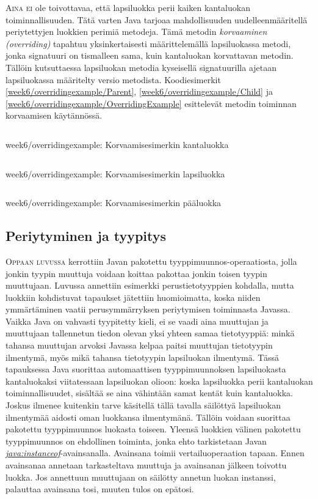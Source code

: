 \documentclass[openany]{book}
\newcommand{\newthought}[1]{\smallskip\textsc{#1}}
\newcommand{\eng}[1]{\textit{(#1)}}
\newcommand{\new}[1]{\textit{\gls{#1}}}
\newcommand{\neweng}[2]{\new{#1} \eng{#2}}
\newcommand{\java}[1]{\underline{\gls{java:#1}}}
\newcommand{\newjava}[1]{\textit{\java{#1}}}
\newcommand{\code}[3]{
	\begin{listing}
		\linespread{0.85}
		\inputminted{java}{OhjelmointiopasEsimerkit/src/#1/#2.java}
		\caption{#1: #3}
		\label{#1/#2}
	\end{listing}
}
\begin{document}
\newthought{Aina ei} ole toivottavaa, että lapsiluokka perii kaiken kantaluokan toiminnallisuuden.
Tätä varten Java tarjoaa mahdollisuuden uudelleenmääritellä periytettyjen luokkien perimiä
metodeja. Tämä metodin \neweng{korvaaminen}{overriding} tapahtuu yksinkertaisesti määrittelemällä
lapsiluokassa metodi, jonka \gls{signatuuri} on tismalleen sama, kuin kantaluokan korvattavan
metodin. Tällöin kutsuttaessa lapsiluokan metodia kyseisellä signatuurilla ajetaan lapsiluokassa
määritelty versio metodista. Koodiesimerkit \ref{week6/overridingexample/Parent},
\ref{week6/overridingexample/Child} ja \ref{week6/overridingexample/OverridingExample} esittelevät
metodin toiminnan korvaamisen käytännössä.

\code{week6/overridingexample}{Parent}{Korvaamisesimerkin kantaluokka}
\code{week6/overridingexample}{Child}{Korvaamisesimerkin lapsiluokka}
\code{week6/overridingexample}{OverridingExample}{Korvaamisesimerkin pääluokka}

\subsection{Periytyminen ja tyypitys}
\label{casting2}

\newthought{Oppaan luvussa}  kerrottiin Javan
\gls{pakotettu tyyppimuunnos}-operaatiosta, jolla jonkin tyypin muuttuja voidaan koittaa pakottaa
jonkin toisen tyypin muuttujaan. Luvussa annettiin esimerkki perustietotyyppien kohdalla, mutta
luokkiin kohdistuvat tapaukset jätettiin huomioimatta, koska niiden ymmärtäminen vaatii
perusymmärryksen periytymisen toiminnasta Javassa. Vaikka Java on vahvasti tyypitetty kieli, ei se
vaadi aina muuttujan ja muuttujaan tallennetun tiedon olevan yksi yhteen samaa tietotyyppiä:
minkä tahansa muuttujan arvoksi Javassa kelpaa paitsi muuttujan tietotyypin ilmentymä, myös mikä
tahansa tietotyypin lapsiluokan ilmentymä. Tässä tapauksessa Java suorittaa automaattisen
tyyppimuunnoksen lapsiluokasta kantaluokaksi viitatessaan lapsiluokan olioon: koska lapsiluokka
perii kantaluokan toiminnallisuudet, sisältää se aina vähintään samat kentät kuin kantaluokka.
Joskus ilmenee kuitenkin tarve käsitellä tällä tavalla säilöttyä lapsiluokan ilmentymää aidosti
oman luokkansa ilmentymänä. Tällöin voidaan suorittaa \gls{pakotettu tyyppimuunnos} luokasta
toiseen. Yleensä luokkien välinen pakotettu tyyppimuunnos on ehdollinen toiminta, jonka ehto
tarkistetaan Javan \newjava{instanceof}-avainsanalla. Avainsana toimii vertailuoperaation tapaan.
Ennen avainsanaa annetaan tarkasteltava muuttuja ja avainsanan jälkeen toivottu luokka. Jos
annettuun muuttujaan on säilötty annetun luokan instanssi, palauttaa avainsana tosi, muuten tulos
on epätosi.
\end{document}
